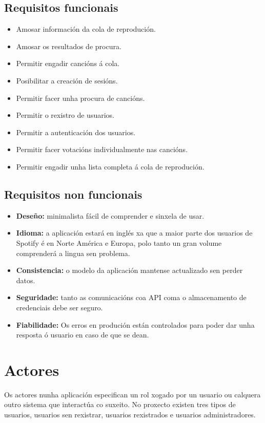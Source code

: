 \subsection{Requisitos funcionais}
\begin{itemize}
		\item Amosar información da cola de reprodución.
		\item Amosar os resultados de procura.
		\item Permitir engadir cancións á cola.
		\item Posibilitar a creación de sesións.
		\item Permitir facer unha procura de cancións.
		\item Permitir o rexistro de usuarios.
		\item Permitir a autenticación dos usuarios.
		\item Permitir facer votacións individualmente nas cancións.
		\item Permitir engadir unha lista completa á cola de reprodución.
\end{itemize}

\subsection{Requisitos non funcionais}
\begin{itemize}
	\item \textbf{Deseño:} minimalista fácil de comprender e sinxela de usar.
	\item \textbf{Idioma:} a aplicación estará en inglés xa que a maior parte dos usuarios de Spotify é en Norte América e Europa, polo tanto un gran volume comprenderá a lingua sen problema.
	\item \textbf{Consistencia:} o modelo da aplicación mantense actualizado sen perder datos.
	\item \textbf{Seguridade:} tanto as comunicacións coa API coma o almacenamento de credenciais debe ser seguro.
	\item \textbf{Fiabilidade:} Os erros en produción están controlados para poder dar unha resposta ó usuario en caso de que se dean.
\end{itemize}

\section{Actores}
Os actores nunha aplicación especifican un rol xogado por un usuario ou calquera outro sistema que interactúa co suxeito. No proxecto existen tres tipos de usuarios, usuarios sen rexistrar, usuarios rexistrados e usuarios administradores.

